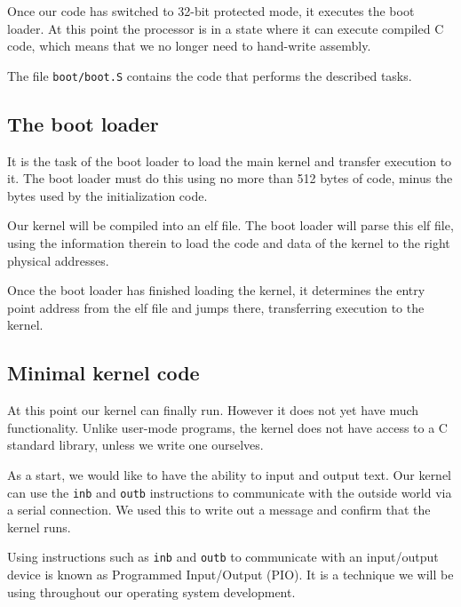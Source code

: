 \documentclass{article}
\begin{document}
Once our code has switched to 32-bit protected mode, it executes the boot
loader. At this point the processor is in a state where it can execute
compiled C code, which means that we no longer need to hand-write assembly.

The file \texttt{boot/boot.S} contains the code that performs the described
tasks.



\subsection{The boot loader}
It is the task of the boot loader to load the main kernel and transfer
execution to it. The boot loader must do this using no more than 512 bytes of
code, minus the bytes used by the initialization code.

Our kernel will be compiled into an \gls{elf} file. The boot loader will parse
this \gls{elf} file, using the information therein to load the code and data
of the kernel to the right physical addresses.


Once the boot loader has finished loading the kernel, it determines the entry
point address from the \gls{elf} file and jumps there, transferring execution to the
kernel.

\subsection{Minimal kernel code}
At this point our kernel can finally run. However it does not yet have much
functionality. Unlike user-mode programs, the kernel does not have access to a
C standard library, unless we write one ourselves.


As a start, we would like to have the ability to input and output text.
Our kernel can use the \texttt{inb} and \texttt{outb} instructions to
communicate with the outside world via a serial connection. We used this to
write out a message and confirm that the kernel runs.

Using instructions such as \texttt{inb} and \texttt{outb} to communicate with
an input/output device is known as Programmed Input/Output (PIO). It is a
technique we will be using throughout our operating system development.


\end{document}
